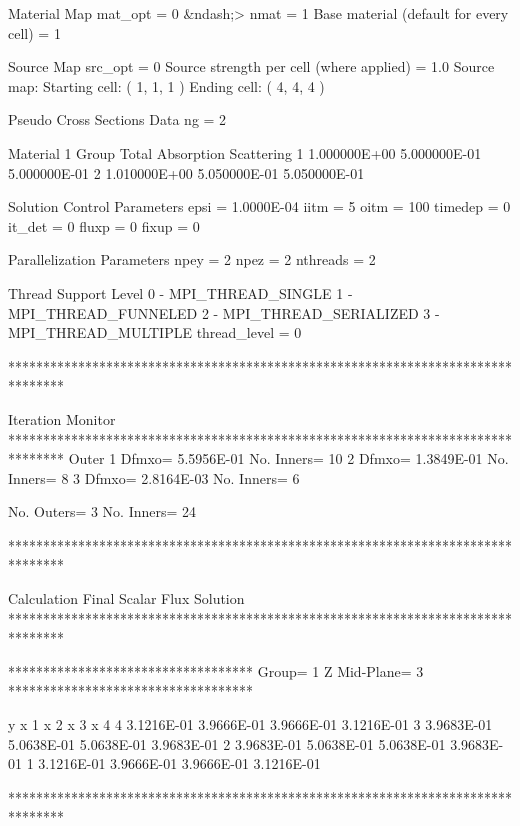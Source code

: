 \begin{DoxyVerb}
  Material Map
    mat_opt = 0   &ndash;>   nmat = 1
    Base material (default for every cell) = 1

  Source Map
    src_opt = 0
    Source strength per cell (where applied) = 1.0
    Source map:
        Starting cell: (     1,     1,     1 )
        Ending cell:   (     4,     4,     4 )

  Pseudo Cross Sections Data
    ng =   2

    Material 1
    Group         Total         Absorption      Scattering
       1       1.000000E+00    5.000000E-01    5.000000E-01
       2       1.010000E+00    5.050000E-01    5.050000E-01

  Solution Control Parameters
    epsi =  1.0000E-04
    iitm =   5
    oitm =  100
    timedep = 0
    it_det = 0
    fluxp = 0
    fixup = 0

  Parallelization Parameters
    npey =     2
    npez =     2
    nthreads =    2

          Thread Support Level
           0 - MPI_THREAD_SINGLE
           1 - MPI_THREAD_FUNNELED
           2 - MPI_THREAD_SERIALIZED
           3 - MPI_THREAD_MULTIPLE
    thread_level =  0

********************************************************************************

          Iteration Monitor
********************************************************************************
  Outer
    1    Dfmxo= 5.5956E-01    No. Inners=   10
    2    Dfmxo= 1.3849E-01    No. Inners=    8
    3    Dfmxo= 2.8164E-03    No. Inners=    6

  No. Outers=   3    No. Inners=   24

********************************************************************************

          Calculation Final Scalar Flux Solution
********************************************************************************

 ***********************************
  Group=   1   Z Mid-Plane=    3
 ***********************************

     y    x    1      x    2      x    3      x    4
     4  3.1216E-01  3.9666E-01  3.9666E-01  3.1216E-01
     3  3.9683E-01  5.0638E-01  5.0638E-01  3.9683E-01
     2  3.9683E-01  5.0638E-01  5.0638E-01  3.9683E-01
     1  3.1216E-01  3.9666E-01  3.9666E-01  3.1216E-01

********************************************************************************


\end{DoxyVerb}
